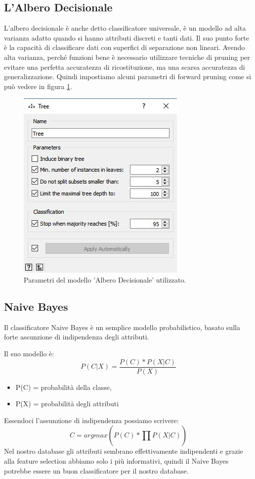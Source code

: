 \documentclass[a4paper, 12p]{report}
\begin{document}
		\subsection{L'Albero Decisionale}
		L'albero decisionale è anche detto classificatore universale, è un modello ad alta varianza adatto quando si hanno attributi discreti e tanti dati. Il suo punto forte è la capacità di classificare dati con superfici di separazione non lineari. Avendo alta varianza, perché funzioni bene è necessario utilizzare tecniche di pruning per evitare una perfetta accuratezza di ricostituzione, ma una scarsa accuratezza di generalizzazione. Quindi impostiamo alcuni parametri di forward pruning come si può vedere in figura \ref{fig:6}.
\begin{figure}	
	\centering
	\includegraphics[scale = 0.8]{img/Tree.JPG}
	\caption{Parametri del modello 'Albero Decisionale' utilizzato. }\label{fig:6}
\end{figure}
	\subsection{Naive Bayes}
	Il classificatore Naive Bayes è un semplice modello probabilistico, basato sulla forte assunzione di indipendenza degli attributi. 
	
	Il suo modello è: 
	\begin{equation}
	P(C|X) = \frac{P(C)*P(X|C)}{P(X)}
	\end{equation}
	\begin{itemize}
		\item P(C) = probabilità della classe,
		\item P(X) = probabilità degli attributi
	\end{itemize}
	Essendoci l'assunzione di indipendenza possiamo scrivere:
	\begin{equation}
	C = argmax (P(C)*\prod_{}{}{P(X|C)})
	\end{equation}
	Nel nostro database gli attributi sembrano effettivamente indipendenti e grazie alla feature selection abbiamo solo i più informativi, quindi il Naive Bayes potrebbe essere un buon classificatore per il nostro database.
\end{document}
